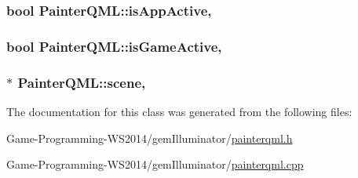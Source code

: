 \subsubsection[{is\+App\+Active}]{\setlength{\rightskip}{0pt plus 5cm}bool Painter\+Q\+M\+L\+::is\+App\+Active\hspace{0.3cm}{\ttfamily [read]}, {\ttfamily [write]}}\label{class_painter_q_m_l_a70ad19e1bbe24b9915c5f23366549a15}
\hypertarget{class_painter_q_m_l_ae878004adcc5589b4ffc81870a700f82}{}
\subsubsection[{is\+Game\+Active}]{\setlength{\rightskip}{0pt plus 5cm}bool Painter\+Q\+M\+L\+::is\+Game\+Active\hspace{0.3cm}{\ttfamily [read]}, {\ttfamily [write]}}\label{class_painter_q_m_l_ae878004adcc5589b4ffc81870a700f82}
\hypertarget{class_painter_q_m_l_a59b4d398bc7880e59bc8296c2669aaab}{}
\subsubsection[{scene}]{ $\ast$ Painter\+Q\+M\+L\+::scene\hspace{0.3cm}{\ttfamily [read]}, {\ttfamily [write]}}\label{class_painter_q_m_l_a59b4d398bc7880e59bc8296c2669aaab}


The documentation for this class was generated from the following files\+:\begin{DoxyCompactItemize}
\item 
Game-\/\+Programming-\/\+W\+S2014/gem\+Illuminator/\hyperlink{painterqml_8h}{painterqml.\+h}\item 
Game-\/\+Programming-\/\+W\+S2014/gem\+Illuminator/\hyperlink{painterqml_8cpp}{painterqml.\+cpp}\end{DoxyCompactItemize}
